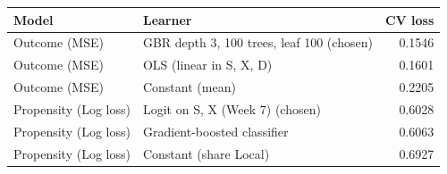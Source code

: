 \begin{tabular}{llr}
\toprule
Model & Learner & CV loss \\
\midrule
Outcome (MSE) & GBR depth 3, 100 trees, leaf 100 (chosen) & 0.1546 \\
Outcome (MSE) & OLS (linear in S, X, D) & 0.1601 \\
Outcome (MSE) & Constant (mean) & 0.2205 \\
Propensity (Log loss) & Logit on S, X (Week 7) (chosen) & 0.6028 \\
Propensity (Log loss) & Gradient-boosted classifier & 0.6063 \\
Propensity (Log loss) & Constant (share Local) & 0.6927 \\
\bottomrule
\end{tabular}
